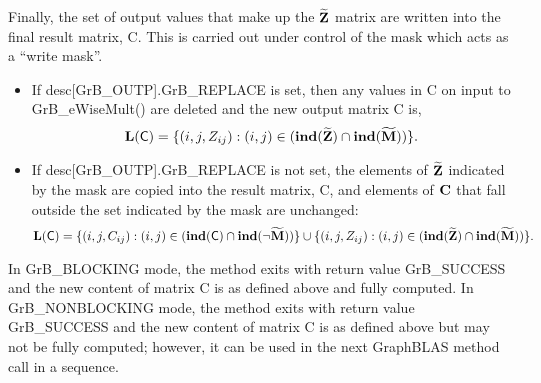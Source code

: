 Finally, the set of output values that make up the ${\bf \widetilde{Z}}$ 
matrix are written into the final result matrix, {\sf C}. 
This is carried out under control of the mask which acts as a ``write mask''.
\begin{itemize}
\item If {\sf desc[GrB\_OUTP].GrB\_REPLACE} is set, then any values in {\sf C} 
on input to {\sf GrB\_eWiseMult()} are deleted and the new output matrix {\sf C} is,
\[ \bold{L}({\sf C}) = \{(i,j,Z_{ij}) : (i,j) \in (\bold{ind}({\bf \widetilde{Z}}) 
\cap \bold{ind}({\bf \widetilde{M}})) \}. \]

\item If {\sf desc[GrB\_OUTP].GrB\_REPLACE} is not set, the elements of 
${\bf \widetilde{Z}}$ indicated by 
the mask are copied into the result matrix, {\sf C}, and elements of 
${\bf C}$ that fall outside the set indicated by the mask are unchanged:
\[ \bold{L}({\sf C}) = \{(i,j,C_{ij}) : (i,j) \in (\bold{ind}({\sf C}) 
\cap \bold{ind}(\neg {\bf \widetilde{M}})) \} \cup \{(i,j,Z_{ij}) : (i,j) \in 
(\bold{ind}({\bf \widetilde{Z}}) \cap \bold{ind}({\bf \widetilde{M}})) \}. \]
\end{itemize}

In {\sf GrB\_BLOCKING} mode, the method exits with return value 
{\sf GrB\_SUCCESS} and the new content of matrix {\sf C} is as defined above
and fully computed.  
In {\sf GrB\_NONBLOCKING} mode, the method exits with return value 
{\sf GrB\_SUCCESS} and the new content of matrix {\sf C} is as defined above 
but may not be fully computed; however, it can be used in the next GraphBLAS 
method call in a sequence.
